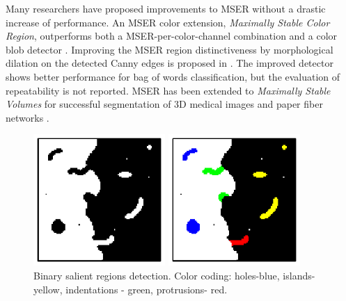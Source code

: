 \documentclass{article}
\begin{document}
Many researchers have proposed improvements to MSER without a drastic increase of performance. An MSER color extension, {\em Maximally Stable Color Region}, outperforms both a MSER-per-color-channel combination and a color blob detector \cite{Forssen07}. Improving the MSER region distinctiveness by morphological dilation on the detected Canny edges is proposed in \cite{Wang14}. The improved detector shows better performance for bag of words classification, but the evaluation of repeatability is not reported. MSER has been extended to {\em Maximally Stable Volumes} for successful segmentation of 3D medical images and paper fiber networks \cite{DonoserB06}.

\begin{figure}[htb]
\vspace{-0.5cm}
\begin{minipage}[b]{.49\linewidth}
  \centering
  \centerline{\includegraphics[width=5cm]{./Figs/binary_marks}}

\end{minipage}
\begin{minipage}[b]{0.49\linewidth}
  \centering
  \centerline{\includegraphics[width=5cm]{./Figs/binary_marks_clean_color_coded}}

\end{minipage}
\vspace{-0.5cm}
\caption{Binary salient regions detection.
Color coding: holes-blue, islands- yellow,
indentations - green, protrusions- red. }
\label{fig:binary_sal}
\end{figure}
\end{document}
